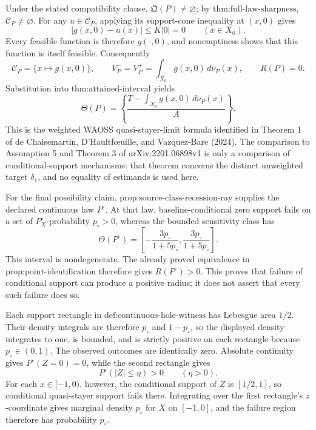 Under the stated compatibility clause, \(\mathfrak Q(P)\neq\varnothing\); by \(\text{thm:full-law-sharpness}\), \(\mathcal C_P\neq\varnothing\).  For any \(u\in\mathcal C_P\), applying its support-cone inequality at \((x,0)\) gives
\[
 |g(x,0)-u(x)|\leq K|0|=0
 \qquad(x\in X_0).
\]
Every feasible function is therefore \(g(\cdot,0)\), and nonemptiness shows that this function is itself feasible.  Consequently
\[
 \mathcal C_P=\{x\mapsto g(x,0)\},
 \qquad
 V_P^-=V_P^+=\int_{X_0}g(x,0)\,d\nu_P(x),
 \qquad
 R(P)=0.
\]
Substitution into \(\text{thm:attained-interval}\) yields
\[
 \Theta(P)=
 \left\{\frac{T-\int_{X_0}g(x,0)\,d\nu_P(x)}{A}\right\}.
\]
This is the weighted WAOSS quasi-stayer-limit formula identified in Theorem 1 of de Chaisemartin, D'Haultf\oe{}uille, and Vazquez-Bare (2024).  The comparison to Assumption 5 and Theorem 3 of arXiv:2201.06898v1 is only a comparison of conditional-support mechanisms: that theorem concerns the distinct unweighted target \(\delta_1\), and no equality of estimands is used here.

For the final possibility claim, \(\text{prop:source-class-recession-ray}\) supplies the declared continuous law \(P^{\circ}\).  At that law, baseline-conditional zero support fails on a set of \(P_X^{\circ}\)-probability \(p_{\circ}>0\), whereas the bounded sensitivity class has
\[
 \Theta(P^{\circ})=
 \left[-\frac{3p_{\circ}}{1+5p_{\circ}},
        \frac{3p_{\circ}}{1+5p_{\circ}}\right].
\]
This interval is nondegenerate.  The already proved equivalence in \(\text{prop:point-identification}\) therefore gives \(R(P^{\circ})>0\).  This proves that failure of conditional support can produce a positive radius; it does not assert that every such failure does so.

Each support rectangle in \(\text{def:continuous-hole-witness}\) has Lebesgue area \(1/2\).  Their density integrals are therefore \(p_{\circ}\) and \(1-p_{\circ}\), so the displayed density integrates to one, is bounded, and is strictly positive on each rectangle because \(p_{\circ}\in(0,1)\).  The observed outcomes are identically zero.  Absolute continuity gives \(P^{\circ}(Z=0)=0\), while the second rectangle gives
\[
 P^{\circ}(|Z|\leq\eta)>0\qquad(\eta>0).
\]
For each \(x\in[-1,0)\), however, the conditional support of \(Z\) is \([1/2,1]\), so conditional quasi-stayer support fails there.  Integrating over the first rectangle's \(z\)-coordinate gives marginal density \(p_{\circ}\) for \(X\) on \([-1,0]\), and the failure region therefore has probability \(p_{\circ}\).

